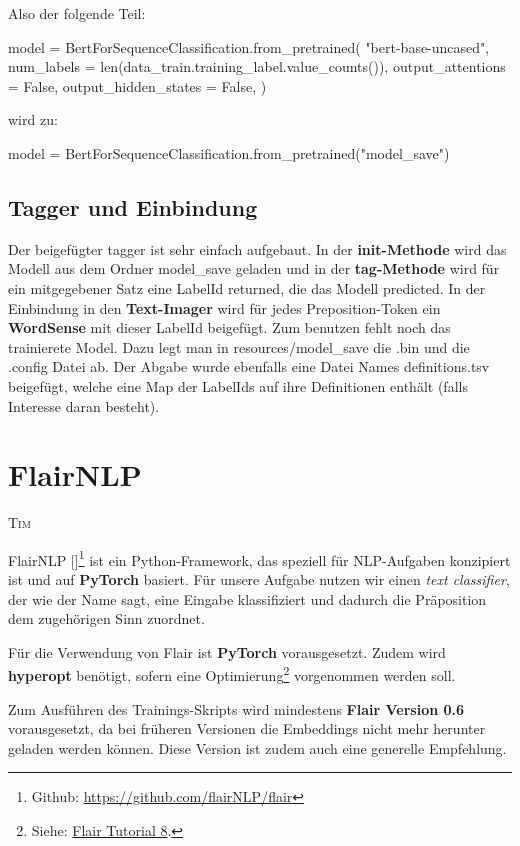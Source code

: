 \documentclass[10pt,a4paper]{article}
\newcommand{\chapterauthor}[1]{%
	{\parindent0pt\vspace*{-5pt}\hspace*{\fill}%
  \linespread{1.1}\large\scshape#1%
  \par\nobreak\vspace*{10pt}}
}
\begin{document}
Also der folgende Teil:
\begin{python}
model = BertForSequenceClassification.from_pretrained(
    "bert-base-uncased", 
    num_labels = len(data_train.training_label.value_counts()), 
    output_attentions = False, 
    output_hidden_states = False, 
)
\end{python}
wird zu:
\begin{python}
model = BertForSequenceClassification.from_pretrained("model_save")
\end{python}


\subsection{Tagger und Einbindung}
Der beigefügter tagger ist sehr einfach aufgebaut. In der \textbf{init-Methode} wird das Modell aus dem Ordner model\_save geladen und in der \textbf{tag-Methode} wird für ein mitgegebener Satz eine LabelId returned, die das Modell predicted. In der Einbindung in den \textbf{Text-Imager} wird für jedes Preposition-Token ein \textbf{WordSense} mit dieser LabelId beigefügt. Zum benutzen fehlt noch das trainierete Model. Dazu legt man in resources/model\_save die .bin und die .config Datei ab. Der Abgabe wurde ebenfalls eine Datei Names definitions.tsv beigefügt, welche eine Map der LabelIds auf ihre Definitionen enthält (falls Interesse daran besteht).

\newpage

\section{FlairNLP}
\chapterauthor{Tim}
\begin{flushleft}
FlairNLP [\cite{flair}]\footnote{Github: \url{https://github.com/flairNLP/flair}} ist ein Python-Framework, das speziell für NLP-Aufgaben konzipiert ist und auf \textbf{PyTorch} basiert. Für unsere Aufgabe nutzen wir einen \textit{text classifier}, der wie der Name sagt, eine Eingabe klassifiziert und dadurch die Präposition dem zugehörigen Sinn zuordnet.

Für die Verwendung von Flair ist \textbf{PyTorch} vorausgesetzt. Zudem wird \textbf{hyperopt} benötigt, sofern eine Optimierung\footnote{Siehe: \href{https://github.com/flairNLP/flair/blob/master/resources/docs/TUTORIAL_8_MODEL_OPTIMIZATION.md}{Flair Tutorial 8}.} vorgenommen werden soll.

Zum Ausführen des Trainings-Skripts wird mindestens \textbf{Flair Version 0.6} vorausgesetzt, da bei früheren Versionen die Embeddings nicht mehr herunter geladen werden können. Diese Version ist zudem auch eine generelle Empfehlung.
\end{flushleft}
\end{document}
